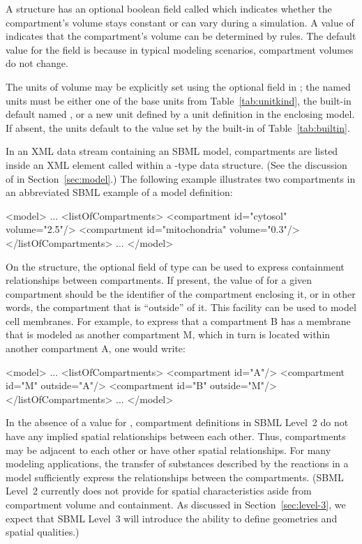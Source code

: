 \documentclass[10pt,twocolumntoc]{cekarticle}
\newcommand{\vref}[1]{\ref{#1}}
\begin{document}
A  structure has an optional boolean field called
 which indicates whether the compartment's volume stays
constant or can vary during a simulation.  A value of 
indicates that the compartment's volume can be determined by rules.  The
default value for the  field is  because
in typical modeling scenarios, compartment volumes do not change.

The units of volume may be explicitly set using the optional field
 in ; the named units must be either one
of the base units from Table~\vref{tab:unitkind}, the built-in default
named , or a new unit defined by a unit definition in the
enclosing model.  If absent, the units default to the value set by the
built-in  of Table~\ref{tab:builtin}.

In an XML data stream containing an SBML model, compartments are listed
inside an XML element called  within a
-type data structure.  (See the discussion of  in
Section~\ref{sec:model}.)  The following example illustrates two
compartments in an abbreviated SBML example of a model definition:

\begin{example}
<model>
    ...
    <listOfCompartments>
        <compartment id="cytosol" volume="2.5"/>
        <compartment id="mitochondria" volume="0.3"/>
    </listOfCompartments>
    ...
</model>
\end{example}

On the  structure, the optional field 
of type  can be used to express containment relationships
between compartments.  If present, the value of  for a given
compartment should be the identifier of the compartment enclosing it, or in
other words, the compartment that is ``outside'' of it.  This facility can
be used to model cell membranes.  For example, to express that a
compartment B has a membrane that is modeled as another compartment M,
which in turn is located within another compartment A, one would write:
\begin{example}
<model>
    ...
    <listOfCompartments>
        <compartment id="A"/>
        <compartment id="M" outside="A"/>
        <compartment id="B" outside="M"/>
    </listOfCompartments>
    ...
</model>
\end{example}

In the absence of a value for , compartment definitions in
SBML Level~2 do not have any implied spatial relationships between each
other.  Thus, compartments may be adjacent to each other or have other
spatial relationships.  For many modeling applications, the transfer of
substances described by the reactions in a model sufficiently express the
relationships between the compartments.  (SBML Level~2 currently does not
provide for spatial characteristics aside from compartment volume and
containment.  As discussed in Section~\ref{sec:level-3}, we expect that
SBML Level~3 will introduce the ability to define geometries and spatial
qualities.)
\end{document}

